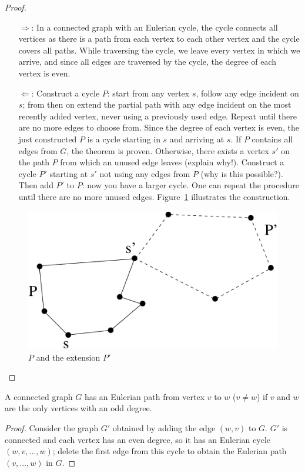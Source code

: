 \begin{proof}
~\\
\begin{itemize}
\item[\underline{$\Rightarrow$}:] In a connected graph with an Eulerian cycle, the cycle connects all
vertices as there is a path from each vertex to each other vertex and the cycle
covers all paths. While traversing the cycle, we leave every vertex in which we
arrive, and since all edges are traversed by the cycle, the degree of each
vertex is even.

\item[\underline{$\Leftarrow$}:] Construct a cycle $P$: start from any vertex $s$, follow any
edge incident on $s$; from then on extend the partial path with any
edge incident on the most recently added vertex, never using a
previously used edge. Repeat until there are no more edges to choose
from. Since the degree of each vertex is even, the just constructed
$P$ is a cycle starting in $s$ and arriving at $s$. If $P$ contains
all edges from $G$, the theorem is proven. Otherwise, there exists a
vertex $s'$ on the path $P$ from which an unused edge leaves (explain
why!). Construct a cycle $P'$ starting at $s'$ not using any edges
from $P$ (why is this possible?). Then add $P'$ to $P$: now you have a
larger cycle. One can repeat the procedure until there are no more
unused edges. Figure~\ref{euler4} illustrates the construction.
\end{itemize}
\begin{figure}[ht]
\begin{center}
\includegraphics[width=0.4\linewidth,keepaspectratio]{euler4}
\end{center}
\caption{ $P$ and the extension $P'$ \label{euler4}}
\end{figure}
\end{proof}

\newpage

\begin{theorem}
  A connected graph $G$ has an Eulerian path from vertex $v$ to $w$
  ($v \neq w$) if $v$ and $w$ are the only vertices with an odd degree.
\end{theorem}
\begin{proof}
Consider the graph $G'$ obtained by adding the edge $(w,v)$ to $G$.
$G'$ is connected and each vertex has an even degree, so it has an
Eulerian cycle $(w,v,\ldots,w)$; delete the first edge from this cycle
to obtain the Eulerian path $(v,\ldots,w)$ in $G$.
\end{proof}

